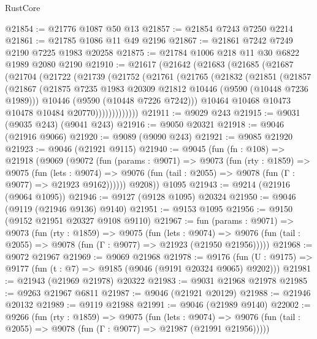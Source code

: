 \begin{lexlean}{RustCore}
\begin{coremodule}
@21854 := @21776 @1087 @50 @13
@21857 := @21854 @7243 @7250 @2214
@21861 := @21785 @1086 @11 @49 @2196
@21867 := @21861 @7242 @7249 @2190 @7225 @1983 @20258
@21875 := @21784 @1006 @218 @11 @30 @6822 @1989 @2080 @2190
@21910 := @21617
    (@21642
      (@21683
        (@21685
          (@21687
            (@21704
              (@21722
                (@21739
                  (@21752
                    (@21761
                      (@21765
                        (@21832
                          (@21851
                            (@21857
                              (@21867
                                (@21875
                                  @7235
                                  @1983
                                  @20309
                                  @21812
                                  @10446
                                  (@9590 (@10448 @7236 @1989)))
                                @10446
                                (@9590 (@10448 @7226 @7242)))
                              @10464
                              @10468
                              @10473
                              @10478
                              @10484
                              @20770)))))))))))))
@21911 := @9029 @243
@21915 := @9031 (@9035 @243) (@9041 @243)
@21916 := @9050 @20321
@21918 := @9046 (@21916 @9066)
@21920 := @9089 (@9090 @243)
@21921 := @9085 @21920
@21923 := @9046 (@21921 @9115)
@21940 := @9045
    (fun (fn : @108) =>
    @21918
      (@9069
        (@9072
          (fun (params : @9071) =>
          @9073
            (fun (rty : @1859) =>
            @9075
              (fun (lets : @9074) =>
              @9076 (fun (tail : @2055) => @9078 (fun (Γ : @9077) => @21923 @9162))))))
        @9208))
    @1095
@21943 := @9214 (@21916 (@9064 @1095))
@21946 := @9127 (@9128 @1095) @20324
@21950 := @9046 (@9119 (@21946 @9136) @9140)
@21951 := @9153 @1095
@21956 := @9150 (@9152 @21951 @20327 @9108 @9110)
@21967 := fun (params : @9071) =>
  @9073
    (fun (rty : @1859) =>
    @9075
      (fun (lets : @9074) =>
      @9076 (fun (tail : @2055) => @9078 (fun (Γ : @9077) => @21923 (@21950 @21956)))))
@21968 := @9072 @21967
@21969 := @9069 @21968
@21978 := @9176
    (fun (U : @9175) => @9177 (fun (t : @7) => @9185 (@9046 (@9191 @20324 @9065) @9202)))
@21981 := @21943 (@21969 @21978) @20322
@21983 := @9031 @21968 @21978
@21985 := @9263 @21967 @6811
@21987 := @9046 (@21921 @20129)
@21988 := @21946 @20132
@21989 := @9119 @21988
@21991 := @9046 (@21989 @9140)
@22002 := @9266
    (fun (rty : @1859) =>
    @9075
      (fun (lets : @9074) =>
      @9076 (fun (tail : @2055) => @9078 (fun (Γ : @9077) => @21987 (@21991 @21956)))))

\end{coremodule}
\end{lexlean}
